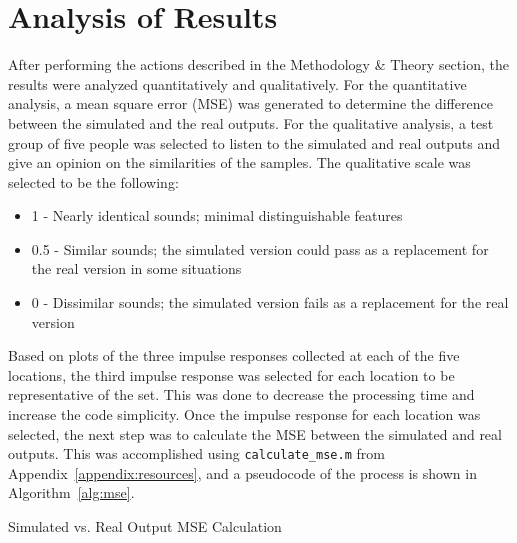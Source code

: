 \documentclass[letterpaper, 11pt, onecolumn, oneside]{article}
\begin{document}
\section{Analysis of Results}
After performing the actions described in the Methodology \& Theory section, the results were analyzed quantitatively and qualitatively.
For the quantitative analysis, a mean square error (MSE) was generated to determine the difference between the simulated and the real outputs.
For the qualitative analysis, a test group of five people was selected to listen to the simulated and real outputs and give an opinion on the similarities of the samples.
The qualitative scale was selected to be the following:
\begin{itemize}
    \item 1 - Nearly identical sounds; minimal distinguishable features
    \item 0.5 - Similar sounds; the simulated version could pass as a replacement for the real version in some situations
    \item 0 - Dissimilar sounds; the simulated version fails as a replacement for the real version
\end{itemize}

Based on plots of the three impulse responses collected at each of the five locations, the third impulse response was selected for each location to be representative of the set.
This was done to decrease the processing time and increase the code simplicity.
Once the impulse response for each location was selected, the next step was to calculate the MSE between the simulated and real outputs.
This was accomplished using \texttt{calculate\_mse.m} from Appendix~\ref{appendix:resources}, and a pseudocode of the process is shown in Algorithm~\ref{alg:mse}.


\begin{algorithm}[H]
    \caption{Simulated vs. Real Output MSE Calculation}
    \label{alg:mse}
    \DontPrintSemicolon

       
        
     

    \BlankLine
\end{algorithm}
\end{document}
